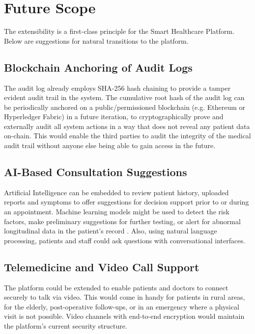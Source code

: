 \documentclass[a4paper,12pt]{report}
\begin{document}
\chapter{Future Scope}

The extensibility is a first-class principle for the Smart Healthcare Platform. Below are suggestions for natural transitions to the platform.

\section{Blockchain Anchoring of Audit Logs}

The audit log already employs SHA-256 hash chaining to provide a tamper evident audit trail in the system. The cumulative root hash of the audit log can be periodically anchored on a public/permissioned blockchain (e.g. Ethereum or Hyperledger Fabric) in a future iteration, to cryptographically prove and externally audit all system actions in a way that does not reveal any patient data on-chain. This would enable the third parties to audit the integrity of the medical audit trail without anyone else being able to gain access in the future.

\section{AI-Based Consultation Suggestions}

Artificial Intelligence can be embedded to review patient history, uploaded reports and symptoms to offer suggestions for decision support prior to or during an appointment. Machine learning models might be used to detect the risk factors, make preliminary suggestions for further testing, or alert for abnormal longitudinal data in the patient's record \cite{parmentola2022}. Also, using natural language processing, patients and staff could ask questions with conversational interfaces.

\section{Telemedicine and Video Call Support}

The platform could be extended to enable patients and doctors to connect securely to talk via video. This would come in handy for patients in rural areas, for the elderly, post-operative follow-ups, or in an emergency where a physical visit is not possible. Video channels with end-to-end encryption would maintain the platform's current security structure.
\end{document}
